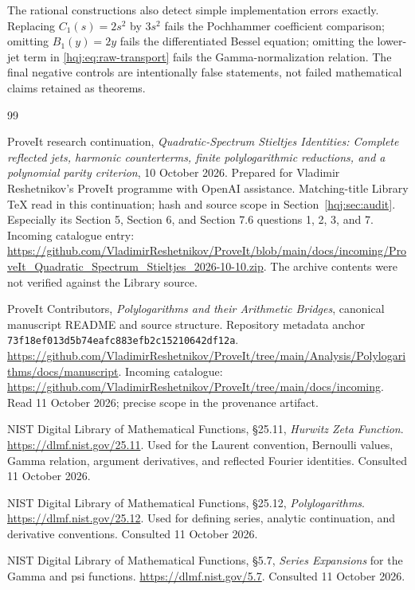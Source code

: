 \documentclass[11pt,letterpaper]{article}
\numberwithin{equation}{section}
\theoremstyle{definition}
\newcommand{\pin}{\nolinkurl{73f18ef013d5b74eafc883efb2c15210642df12a}}
\begin{document}
The rational constructions also detect simple implementation errors
exactly. Replacing $C_1(s)=2s^2$ by $3s^2$ fails the Pochhammer
coefficient comparison; omitting $B_1(y)=2y$ fails the differentiated
Bessel equation; omitting the lower-jet term in
\eqref{hqj:eq:raw-transport} fails the Gamma-normalization relation.
The final negative controls are intentionally false statements, not
failed mathematical claims retained as theorems.

\begingroup\raggedright
\begin{thebibliography}{99}
ProveIt research continuation,
\emph{Quadratic-Spectrum Stieltjes Identities: Complete reflected jets,
harmonic counterterms, finite polylogarithmic reductions, and a polynomial
parity criterion}, 10 October 2026. Prepared for Vladimir Reshetnikov's
ProveIt programme with OpenAI assistance. Matching-title Library TeX
read in this continuation; hash and source scope in Section~\ref{hqj:sec:audit}.
Especially its Section 5, Section 6, and Section 7.6 questions 1, 2, 3,
and 7. Incoming catalogue entry:
\url{https://github.com/VladimirReshetnikov/ProveIt/blob/main/docs/incoming/ProveIt_Quadratic_Spectrum_Stieltjes_2026-10-10.zip}.
The archive contents were not verified against the Library source.

ProveIt Contributors,
\emph{Polylogarithms and their Arithmetic Bridges}, canonical manuscript
README and source structure. Repository metadata anchor \pin.
\url{https://github.com/VladimirReshetnikov/ProveIt/tree/main/Analysis/Polylogarithms/docs/manuscript}.
Incoming catalogue:
\url{https://github.com/VladimirReshetnikov/ProveIt/tree/main/docs/incoming}.
Read 11 October 2026; precise scope in the provenance artifact.

NIST Digital Library of Mathematical Functions,
\S25.11, \emph{Hurwitz Zeta Function}.
\url{https://dlmf.nist.gov/25.11}.
Used for the Laurent convention, Bernoulli values, Gamma relation,
argument derivatives, and reflected Fourier identities. Consulted
11 October 2026.

NIST Digital Library of Mathematical Functions,
\S25.12, \emph{Polylogarithms}.
\url{https://dlmf.nist.gov/25.12}.
Used for defining series, analytic continuation, and derivative
conventions. Consulted 11 October 2026.

NIST Digital Library of Mathematical Functions,
\S5.7, \emph{Series Expansions} for the Gamma and psi functions.
\url{https://dlmf.nist.gov/5.7}. Consulted 11 October 2026.


\end{thebibliography}
\end{document}
